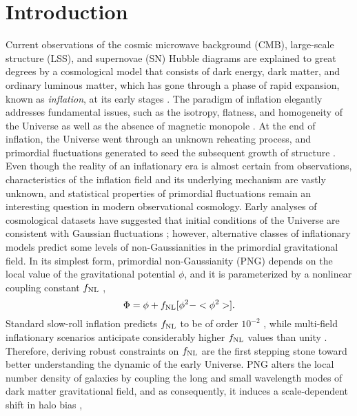 \section{Introduction}
\label{sec:introduction}
Current observations of the cosmic microwave background (CMB), large-scale structure (LSS), and supernovae (SN) Hubble diagrams are explained to great degrees by a cosmological model that consists of dark energy, dark matter, and ordinary luminous matter, which has gone through a phase of rapid expansion, known as \textit{inflation}, at its early stages \citep[see, e.g.,][]{weinberg2013observational}. The paradigm of inflation elegantly addresses fundamental issues, such as the isotropy, flatness, and homogeneity of the Universe as well as the absence of magnetic monopole \citep[see, e.g.,][]{weinberg2008cosmology}. At the end of inflation, the Universe went through an unknown reheating process, and primordial fluctuations generated to seed the subsequent growth of structure \citep{kofman1994reheating, bassett2006inflation, lyth2009primordial}. Even though the reality of an inflationary era is almost certain from observations, characteristics of the inflation field and its underlying mechanism are vastly unknown, and statistical properties of primordial fluctuations remain an interesting question in modern observational cosmology. Early analyses of cosmological datasets have suggested that initial conditions of the Universe are consistent with Gaussian fluctuations \citep{guth2005inflationary}; however, alternative classes of inflationary models predict some levels of non-Gaussianities in the primordial gravitational field. In its simplest form, primordial non-Gaussianity (PNG) depends on the local value of the gravitational potential $\phi$, and it is parameterized by a nonlinear coupling constant $f_{\rm NL}$ \citep{komatsu2001acoustic},
\begin{equation}
 \Phi = \phi + f_{\rm NL} [\phi^{2} - <\phi^{2}>].
\end{equation}
Standard slow-roll inflation predicts $f_{\rm NL}$ to be of order $10^{-2}$ \citep[see, e.g.,][for a review]{alvarez2014arXiv1412.4671A}, while multi-field inflationary scenarios anticipate considerably higher $f_{\rm NL}$ values than unity \citep[see, e.g.,][]{de2017next}. Therefore, deriving robust constraints on $f_{\rm NL}$ are the first stepping stone toward better understanding the dynamic of the early Universe. PNG alters the local number density of galaxies by coupling the long and small wavelength modes of dark matter gravitational field, and as consequently, it induces a scale-dependent shift in halo bias \citep[see, e.g.,][]{dalal2008imprints, slosar2008constraints},
